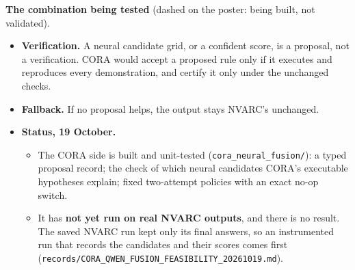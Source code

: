 \documentclass[11pt]{article}
\begin{document}
\textbf{The combination being tested} (dashed on the poster: being built, not validated).
\begin{center}
\end{center}
\begin{itemize}
  \item \textbf{Verification.} A neural candidate grid, or a confident score, is a proposal, not a verification. CORA
        would accept a proposed rule only if it executes and reproduces every demonstration, and certify it only under
        the unchanged checks.
  \item \textbf{Fallback.} If no proposal helps, the output stays NVARC's unchanged.
  \item \textbf{Status, 19 October.}
        \begin{itemize}
          \item The CORA side is built and unit-tested (\texttt{cora\_neural\_fusion/}): a typed proposal record; the
                check of which neural candidates CORA's executable hypotheses explain; fixed two-attempt policies with
                an exact no-op switch.
          \item It has \textbf{not yet run on real NVARC outputs}, and there is no result. The saved NVARC run kept only
                its final answers, so an instrumented run that records the candidates and their scores comes first
                (\texttt{records/CORA\_QWEN\_FUSION\_FEASIBILITY\_20261019.md}).
        \end{itemize}
\end{itemize}
\end{document}
